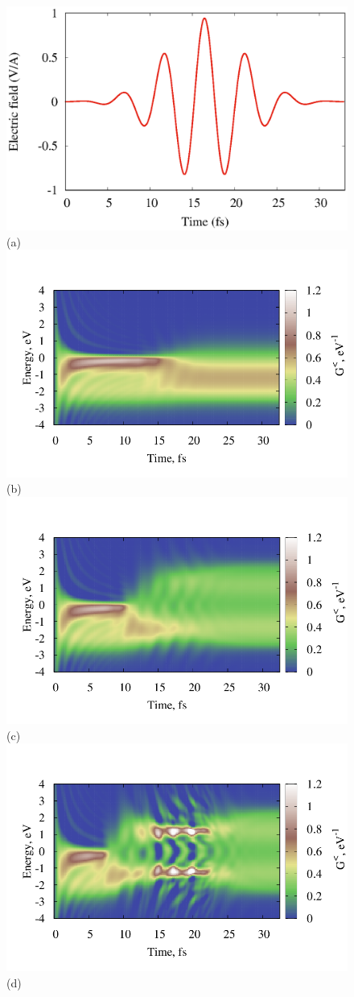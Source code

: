 \documentclass[prb,aps,twocolumn,showpacs,amsmath,amssymb]{revtex4}%
\begin{document}
\begin{figure}[h!]
 \includegraphics[width=0.8\linewidth,angle=0]{E_32.eps} (a)
\includegraphics[width=0.8\linewidth,angle=0]{3d_les_E_1_10_9.png}(b)
 \includegraphics[width=0.8\linewidth,angle=0]{3d_les_E_5_10_9.png}(c)
 \includegraphics[width=0.8\linewidth,angle=0]{3d_les_E_2_10_10.png}(d)

\end{figure}
\end{document}

